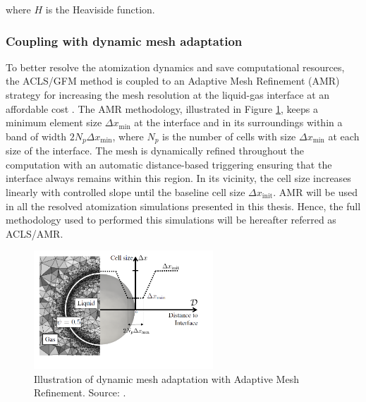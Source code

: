 where $H$ is the Heaviside function.


\subsubsection*{Coupling with dynamic mesh adaptation}

To better resolve the atomization dynamics and save computational resources, the ACLS/GFM method is coupled to an Adaptive Mesh Refinement (AMR) strategy for increasing the mesh resolution at the liquid-gas interface at an affordable cost . The AMR methodology, illustrated in Figure \ref{fig:AMR_strategy}, keeps a minimum element size $\Delta x_\mathrm{min}$ at the interface and in its surroundings within a band of width $2 N_p\Delta x_\mathrm{min}$, where $N_p$ is the number of cells with size $\Delta x_\mathrm{min}$ at each size of the interface. The mesh is dynamically refined throughout the computation with an automatic distance-based triggering ensuring that the interface always remains within this region. In its vicinity, the cell size increases linearly with controlled slope until the baseline cell size $\Delta x_\mathrm{init}$. AMR will be used in all the resolved atomization simulations presented in this thesis. Hence, the full methodology used to performed this simulations will be hereafter referred as ACLS/AMR.

\begin{figure}[ht]
    \centering
    \includegraphics[width=0.6\textwidth]{./part1_numerical_approaches/figures_ch2/AMR}
       \centering
    \caption[Illustration of dynamic mesh adaptation with Adaptive Mesh Refinement]{Illustration of dynamic mesh adaptation with Adaptive Mesh Refinement. Source: .}
    \label{fig:AMR_strategy}
\end{figure}

